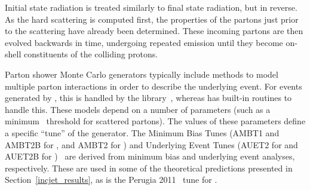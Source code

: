 Initial state radiation is treated similarly to final state radiation, but in reverse. As the hard scattering is computed first, the properties of the partons just prior to the scattering have already been determined. These incoming partons are then evolved backwards in time, undergoing repeated emission until they become on-shell constituents of the colliding protons.
 
Parton shower Monte Carlo generators typically include methods to model multiple parton interactions in order to describe the underlying event. For events generated by \herwig, this is handled by the \jimmy library~\cite{Jimmy}, whereas \pythia has built-in routines to handle this. These models depend on a number of parameters (such as a minimum \pt~threshold for scattered partons). The values of these parameters define a specific ``tune'' of the generator. The \atlas Minimum Bias Tunes (AMBT1 and AMBT2B for \pythia, and AMBT2 for \herwig) and \atlas Underlying Event Tunes (AUET2 for \herwig and AUET2B for \pythia)~\cite{atlas_AMBT_AUET} are derived from \atlas minimum bias and underlying event analyses, respectively. These are used in some of the theoretical predictions presented in Section~\ref{incjet_results}, as is the Perugia 2011~\cite{perugia2011} tune for \pythia.





